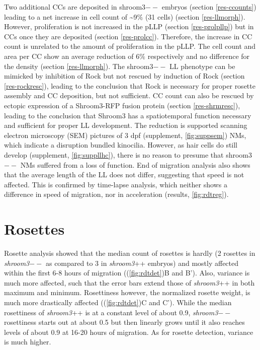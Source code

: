 \documentclass[11pt,singlespacinge,twoside]{reedthesis} %
\begin{document}
Two additional CCs are deposited in shroom3\(--\) embryos (section \ref{res-ccounts}) leading to a net increase in cell count of \textasciitilde{}9\(\%\) (31 cells) (section \ref{res-llmorph}). However, proliferation is not increased in the pLLP (section \ref{res-prolpllp}) but in CCs once they are deposited (section \ref{res-prolcc}). Therefore, the increase in CC count is unrelated to the amount of proliferation in the pLLP. The cell count and area per CC show an average reduction of 6\(\%\) respectively and no difference for the density (section \ref{res-llmorph}).
The shroom3\(--\) LL phenotype can be mimicked by inhibition of Rock but not rescued by induction of Rock (section \ref{res-rockresc}), leading to the conclusion that Rock is necessary for proper rosette assembly and CC deposition, but not sufficient. CC count can also be rescued by ectopic expression of a Shroom3-RFP fusion protein (section \ref{res-shrmresc}), leading to the conclusion that Shroom3 has a spatiotemporal function necessary and sufficient for proper LL development.
The reduction is supported scanning electron microscopy (SEM) pictures of 3 dpf (supplement, \ref{fig:suppsem}) NMs, which indicate a disruption bundled kinocilia. However, as hair cells do still develop (supplement, \ref{fig:suppllhc}), there is no reason to presume that shroom3\(--\) NMs suffered from a loss of function. End of migration analysis also shows that the average length of the LL does not differ, suggesting that speed is not affected. This is confirmed by time-lapse analysis, which neither shows a difference in speed of migration, nor in acceleration (results, \ref{fig:rdtreg}).

\hypertarget{rosettes}{%
\section{Rosettes}\label{rosettes}}

Rosette analysis showed that the median count of rosettes is hardly (2 rosettes in \emph{shroom3}\(--\) as compared to 3 in \emph{shroom3}++ embryos) and mostly affected within the first 6-8 hours of migration ((\ref{fig:rdtdet})B and B'). Also, variance is much more affected, such that the error bars extend those of \emph{shroom3}++ in both maximum and minimum. Rosettiness however, the normalized rosette weight, is much more drastically affected ((\ref{fig:rdtdet})C and C'). While the median rosettiness of \emph{shroom3}++ is at a constant level of about 0.9, \emph{shroom3}\(--\) rosettiness starts out at about 0.5 but then linearly grows until it also reaches levels of about 0.9 at 16-20 hours of migration. As for rosette detection, variance is much higher.
\end{document}
